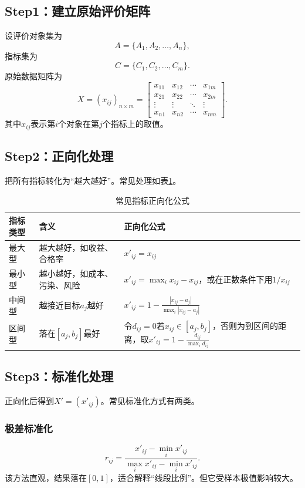 \documentclass[UTF8,a4paper,12pt,fontset=none]{ctexart}
\begin{document}
\subsection{Step1：建立原始评价矩阵}
设评价对象集为
\[
A=\{A_1,A_2,\ldots,A_n\},
\]
指标集为
\[
C=\{C_1,C_2,\ldots,C_m\}.
\]
原始数据矩阵为
\[
X=(x_{ij})_{n\times m}=\begin{bmatrix}
 x_{11} & x_{12} & \cdots & x_{1m}\\
 x_{21} & x_{22} & \cdots & x_{2m}\\
 \vdots & \vdots & \ddots & \vdots\\
 x_{n1} & x_{n2} & \cdots & x_{nm}
\end{bmatrix}.
\]
其中$x_{ij}$表示第$i$个对象在第$j$个指标上的取值。

\subsection{Step2：正向化处理}
把所有指标转化为“越大越好”。常见处理如表\ref{tab:positive}。

\begin{table}[H]
\centering
\caption{常见指标正向化公式}
\label{tab:positive}
\begin{tabular}{p{2.5cm}p{4.2cm}p{6.2cm}}
\toprule
指标类型 & 含义 & 正向化公式\\
\midrule
最大型 & 越大越好，如收益、合格率 & $x'_{ij}=x_{ij}$\\
最小型 & 越小越好，如成本、污染、风险 & $x'_{ij}=\max_i x_{ij}-x_{ij}$，或在正数条件下用$1/x_{ij}$\\
中间型 & 越接近目标$a_j$越好 & $x'_{ij}=1-\frac{|x_{ij}-a_j|}{\max_i |x_{ij}-a_j|}$\\
区间型 & 落在$[a_j,b_j]$最好 & 令$d_{ij}=0$若$x_{ij}\in[a_j,b_j]$，否则为到区间的距离，取$x'_{ij}=1-\frac{d_{ij}}{\max_i d_{ij}}$\\
\bottomrule
\end{tabular}
\end{table}

\subsection{Step3：标准化处理}
正向化后得到$X'=(x'_{ij})$。常见标准化方式有两类。

\subsubsection{极差标准化}
\[
r_{ij}=\frac{x'_{ij}-\min_i x'_{ij}}{\max_i x'_{ij}-\min_i x'_{ij}}.
\]
该方法直观，结果落在$[0,1]$，适合解释“线段比例”。但它受样本极值影响较大。
\end{document}
